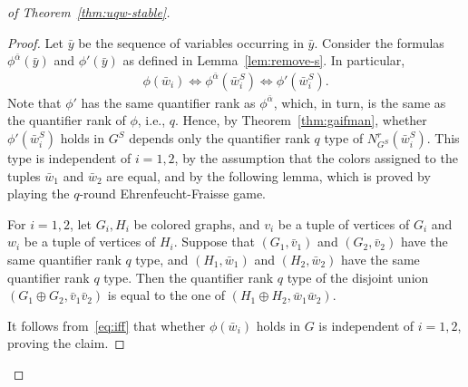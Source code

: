 \begin{proof}[ of Theorem~\ref{thm:uqw-stable}]
\begin{proof}
	Let $\bar y$ be the sequence of variables occurring in $\bar y$.
	Consider the formulas $\phi^{\bar \alpha}(\bar y)$ and $\phi'(\bar y)$ as defined in Lemma~\ref{lem:remove-s}.
	In particular, 
	\begin{align}\label{eq:iff}
	\phi(\bar w_i)\iff\phi^{\bar\alpha}(\bar w_i^S)\iff \phi'(\bar w_i^S).		
	\end{align}
		Note that $\phi'$ has the same quantifier rank as $\phi^{\bar \alpha}$, which, in turn, is the same as the quantifier rank of $\phi$, i.e., $q$. Hence, by Theorem~\ref{thm:gaifman}, whether $\phi'(\bar w_i^S)$ holds in $G^S$ depends only the quantifier rank $q$ type of $N^r_{G^S}(\bar w_i^S)$. This type is independent of $i=1,2$,  by the assumption that the colors assigned to the tuples $\bar w_1$ and $\bar w_2$ are equal, and by the following lemma,
which is proved by  playing the $q$-round Ehrenfeucht-Fraisse game. 

		\begin{lemma}\label{lem:type-union}
			For $i=1,2$, let $G_i,H_i$ be colored graphs,
			and $v_i$ be a tuple of vertices of $G_i$
			and $w_i$ be a tuple of vertices of $H_i$.
			Suppose that $(G_1,\bar v_1)$ and $(G_2,\bar v_2)$ 
			have the same quantifier rank $q$ type,
			and $(H_1,\bar w_1)$ and $(H_2,\bar w_2)$ 
			have the same quantifier rank $q$ type.			
			Then the quantifier rank $q$ type of the disjoint union $(G_1\oplus G_2,\bar v_1\bar v_2)$ is equal to the one of $(H_1\oplus H_2,\bar w_1\bar w_2)$. \end{lemma}


				
It follows from~\eqref{eq:iff} that whether $\phi(\bar w_i)$ holds
in $G$ is independent of $i=1,2$, proving the claim.
\end{proof}


%
%
%



\end{proof}
